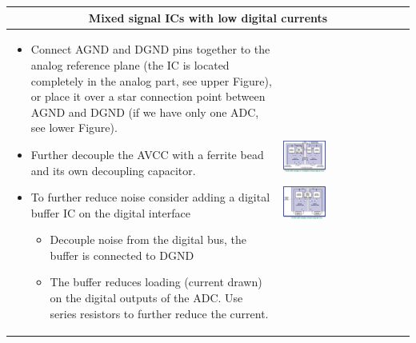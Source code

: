 				\begin{table}[h!]
				\centering
				\begin{tabular}{|m{}|m{}|}

						\multicolumn{2}{c}{\textbf{Mixed signal ICs with low digital currents}}
					\\
					\hline
						\begin{itemize}
							\item Connect AGND and DGND pins together to the analog reference plane (the IC is located completely in the analog part, see upper Figure), or place it over a star connection point between AGND and DGND (if we have only one ADC, see lower Figure).
							\item Further decouple the AVCC with a ferrite bead and its own decoupling capacitor. 
							\item To further reduce noise consider adding a digital buffer IC on the digital interface
							\begin{itemize}
								\item Decouple noise from the digital bus, the buffer is connected to DGND
								\item The buffer reduces loading (current drawn) on the digital outputs of the ADC. Use series resistors to further reduce the current. 
							\end{itemize}
						\end{itemize}
					& 
						 \begin{center}\includegraphics[width=0.35\textwidth]{images/MixedSignal2.png}\end{center}  
						 \begin{center}\includegraphics[width=0.35\textwidth]{images/MixedSignal3.png}\end{center}

\end{tabular}
\end{table}
